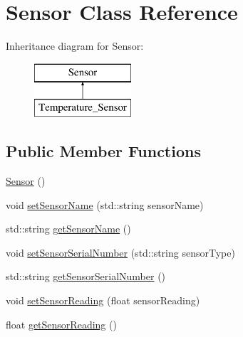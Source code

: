 \hypertarget{class_sensor}{}\section{Sensor Class Reference}
\label{class_sensor}
Inheritance diagram for Sensor\+:\begin{figure}[H]
\begin{center}
\leavevmode
\includegraphics[height=2.000000cm]{class_sensor}
\end{center}
\end{figure}
\subsection*{Public Member Functions}
\begin{DoxyCompactItemize}
\item 
\mbox{\hyperlink{class_sensor_a342d6d11ef572c8cba92cb76fb1a294b}{Sensor}} ()
\item 
void \mbox{\hyperlink{class_sensor_add1838a85fc68b6c0b61a4a233e5fcaf}{set\+Sensor\+Name}} (std\+::string sensor\+Name)
\item 
std\+::string \mbox{\hyperlink{class_sensor_aa8250e5192cfd751fad294930fabf92b}{get\+Sensor\+Name}} ()
\item 
void \mbox{\hyperlink{class_sensor_a59ad3f638a81e29a9fac3526be948ce5}{set\+Sensor\+Serial\+Number}} (std\+::string sensor\+Type)
\item 
std\+::string \mbox{\hyperlink{class_sensor_ad59209d7c8aed356ba8aa2ff832c37cc}{get\+Sensor\+Serial\+Number}} ()
\item 
void \mbox{\hyperlink{class_sensor_aa89b192e3203c85e62599c6239f01225}{set\+Sensor\+Reading}} (float sensor\+Reading)
\item 
float \mbox{\hyperlink{class_sensor_a399de2e826af7fe32a579f93dbfad1b2}{get\+Sensor\+Reading}} ()
\end{DoxyCompactItemize}
